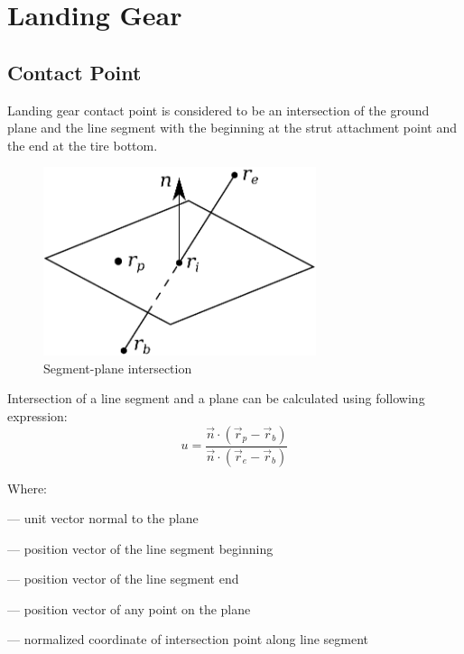 \chapter{Landing Gear}

\section{Contact Point}

Landing gear contact point is considered to be an intersection of the ground plane and the line segment with the beginning at the strut attachment point and the end at the tire bottom.

\begin{figure}
  \centering
  \includegraphics[width=80mm]{images/segment_plane_intersection.eps}
  \caption{Segment-plane intersection}
\end{figure}

Intersection of a line segment and a plane can be calculated using following expression: \cite{ORourke1998}
\begin{equation}
  \label{eq-lg-intersection}
  u =
  \frac
  { \vec n \cdot \left( {\vec r}_p - {\vec r}_b \right) }
  { \vec n \cdot \left( {\vec r}_e - {\vec r}_b \right) }
\end{equation}

Where:
\begin{description}[align=right,labelwidth=1cm]
  \item [$\vec n$]     --- unit vector normal to the plane
  \item [${\vec r}_b$] --- position vector of the line segment beginning
  \item [${\vec r}_e$] --- position vector of the line segment end
  \item [${\vec p}_b$] --- position vector of any point on the plane
  \item [$u$]          --- normalized coordinate of intersection point along line segment
\end{description}

